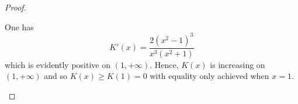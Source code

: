 \documentclass[10pt]{amsart}
\begin{document}
\begin{proof}
\begin{itemize}
One has
$$K'(x) = \frac{2 (x^2 - 1)^3}{x^3(x^2 + 1)}$$
which is evidently positive on $(1, +\infty)$. Hence, $K(x)$ is increasing on $(1, +\infty)$ and so $K(x) \geq K(1) = 0$ with equality only achieved when $x = 1$.
\end{itemize}
\end{proof}
\end{document}
